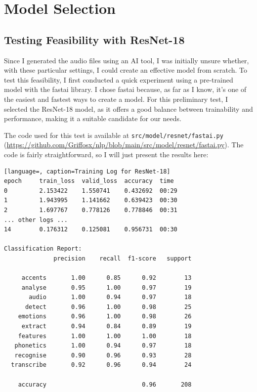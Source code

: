\documentclass[12pt]{article}
\begin{document}
\section{Model Selection}

\subsection{Testing Feasibility with ResNet-18}

Since I generated the audio files using an AI tool, I was initially unsure whether, with these particular settings, I could create an effective model from scratch. To test this feasibility, I first conducted a quick experiment using a pre-trained model with the fastai library. I chose fastai because, as far as I know, it’s one of the easiest and fastest ways to create a model. For this preliminary test, I selected the ResNet-18 model, as it offers a good balance between trainability and performance, making it a suitable candidate for our needs.

The code used for this test is available at \texttt{src/model/resnet/fastai.py} 
\\ (\href{https://github.com/Griffosx/nlp/blob/main/src/model/resnet/fastai.py}{https://github.com/Griffosx/nlp/blob/main/src/model/resnet/fastai.py}). The code is fairly straightforward, so I will just present the results here:

\begin{lstlisting}[language=, caption=Training Log for ResNet-18]
epoch     train_loss  valid_loss  accuracy  time
0         2.153422    1.550741    0.432692  00:29
1         1.943995    1.141662    0.639423  00:30
2         1.697767    0.778126    0.778846  00:31
... other logs ...
14        0.176312    0.125081    0.956731  00:30

Classification Report:
              precision    recall  f1-score   support

     accents       1.00      0.85      0.92        13
     analyse       0.95      1.00      0.97        19
       audio       1.00      0.94      0.97        18
      detect       0.96      1.00      0.98        25
    emotions       0.96      1.00      0.98        26
     extract       0.94      0.84      0.89        19
    features       1.00      1.00      1.00        18
   phonetics       1.00      0.94      0.97        18
   recognise       0.90      0.96      0.93        28
  transcribe       0.92      0.96      0.94        24

    accuracy                           0.96       208
\end{lstlisting}
\end{document}
